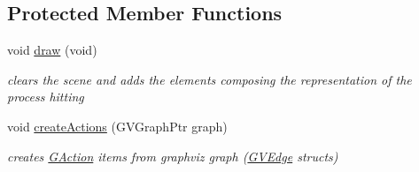 \subsection*{\-Protected \-Member \-Functions}
\begin{DoxyCompactItemize}
\item 
\hypertarget{class_p_h_scene_ad4a998d52e4b2422101a63ba05a24092}{void \hyperlink{class_p_h_scene_ad4a998d52e4b2422101a63ba05a24092}{draw} (void)}\label{class_p_h_scene_ad4a998d52e4b2422101a63ba05a24092}

\begin{DoxyCompactList}\small\item\em clears the scene and adds the elements composing the representation of the process hitting \end{DoxyCompactList}\item 
void \hyperlink{class_p_h_scene_a38adb7513578a42800228bd442f95ad7}{create\-Actions} (\-G\-V\-Graph\-Ptr graph)
\begin{DoxyCompactList}\small\item\em creates \hyperlink{class_g_action}{\-G\-Action} items from graphviz graph (\hyperlink{struct_g_v_edge}{\-G\-V\-Edge} structs) \end{DoxyCompactList}\end{DoxyCompactItemize}
